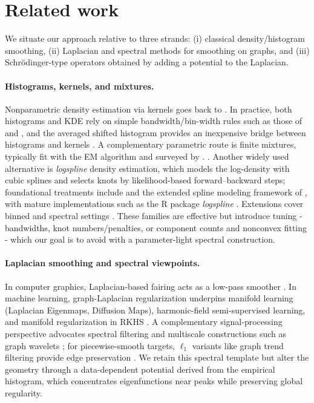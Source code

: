 \documentclass[10pt]{article} %
\begin{document}
\section{Related work}\label{sec:review}

We situate our approach relative to three strands: (i) classical density/histogram smoothing, (ii) Laplacian and spectral methods for smoothing on graphs, and (iii) Schr\"odinger-type operators obtained by adding a potential to the Laplacian.

\paragraph{Histograms, kernels, and mixtures.} Nonparametric density estimation via kernels goes back to \citet{kde_rosenblatt,kde_parzen}. In practice, both histograms and KDE rely on simple bandwidth/bin-width rules such as those of \citet{Scott1979} and \citet{FreedmanDiaconis1981}, and the averaged shifted histogram provides an inexpensive bridge between histograms and kernels \citep{Scott1985ASH}. A complementary parametric route is finite mixtures, typically fit with the EM algorithm \citep{Dempster1977EM} and surveyed by \citet{McLachlanPeel2000}. . Another widely used alternative is \emph{logspline} density estimation, which models the log-density with cubic splines and selects knots by likelihood-based forward--backward steps; foundational treatments include \citet{KooperbergStone1991,KooperbergStone1992} and the extended spline modeling framework of \citet{StoneHansenKooperbergTruong1997}, with mature implementations such as the R package \emph{logspline} \citep{logsplineCRAN}. Extensions cover binned and spectral settings \citep{Koo2000,KooperbergStoneTruong1995Rate}. These families are effective but introduce tuning - bandwidths, knot numbers/penalties, or component counts and nonconvex fitting - which our goal is to avoid with a parameter-light spectral construction.

\paragraph{Laplacian smoothing and spectral viewpoints.} In computer graphics, Laplacian-based fairing acts as a low-pass smoother \citep{Taubin1995,Desbrun1999ImplicitFairing}. In machine learning, graph-Laplacian regularization underpins manifold learning (Laplacian Eigenmaps, Diffusion Maps), harmonic-field semi-supervised learning, and manifold regularization in RKHS \citep{BelkinNiyogi2003,CoifmanLafon2006,ZhuGhahramaniLafferty2003,BelkinNiyogiSindhwani2006}. A complementary signal-processing perspective advocates spectral filtering and multiscale constructions such as graph wavelets \citep{Shuman2013SPMag,Hammond2011}; for piecewise-smooth targets, $\ell_1$ variants like graph trend filtering provide edge preservation \citep{Wang2016GraphTrendFiltering}. We retain this spectral template but alter the geometry through a data-dependent potential derived from the empirical histogram, which concentrates eigenfunctions near peaks while preserving global regularity.
\end{document}
